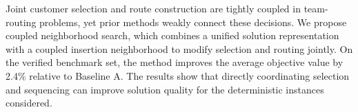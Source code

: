 Joint customer selection and route construction are tightly coupled in team-routing problems, yet prior methods weakly connect these decisions. We propose coupled neighborhood search, which combines a unified solution representation with a coupled insertion neighborhood to modify selection and routing jointly. On the verified benchmark set, the method improves the average objective value by 2.4\% relative to Baseline A. The results show that directly coordinating selection and sequencing can improve solution quality for the deterministic instances considered.
